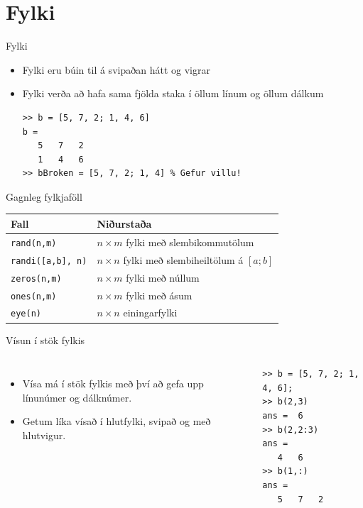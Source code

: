 \documentclass[handout]{beamer}
\begin{document}
\section{Fylki}

\begin{frame}[fragile]{Fylki}
\begin{itemize}
 \item Fylki eru búin til á svipaðan hátt og vigrar
 \item Fylki verða að hafa sama fjölda staka í öllum línum og öllum dálkum
\begin{verbatim}
>> b = [5, 7, 2; 1, 4, 6]
b =
   5   7   2
   1   4   6
>> bBroken = [5, 7, 2; 1, 4] % Gefur villu!
\end{verbatim}
\end{itemize}
\end{frame}

\begin{frame}{Gagnleg fylkjaföll}
\begin{center}
\begin{tabular}{ll}
\toprule
Fall&Niðurstaða\\
\midrule
\texttt{rand(n,m)}&$n\times m$ fylki með slembikommutölum \\
\texttt{randi([a,b], n)}&$n\times n$ fylki með slembiheiltölum á $[a;b]$\\
\texttt{zeros(n,m)}&$n \times m $ fylki með núllum\\
\texttt{ones(n,m)}&$n \times m $ fylki með ásum\\
\texttt{eye(n)}&$n \times n$ einingarfylki\\
\bottomrule
\end{tabular}
\end{center}
\end{frame}

\begin{frame}[fragile]{Vísun í stök fylkis}
\begin{columns}
\begin{itemize}
 \item Vísa má í stök fylkis með því að gefa upp línunúmer og dálknúmer.
 \item Getum líka vísað í hlutfylki, svipað og með hlutvigur.
\end{itemize}
\begin{verbatim}
>> b = [5, 7, 2; 1, 4, 6];
>> b(2,3)
ans =  6
>> b(2,2:3)
ans =
   4   6
>> b(1,:)
ans =
   5   7   2
\end{verbatim}
\end{columns}
\end{frame}
\end{document}
